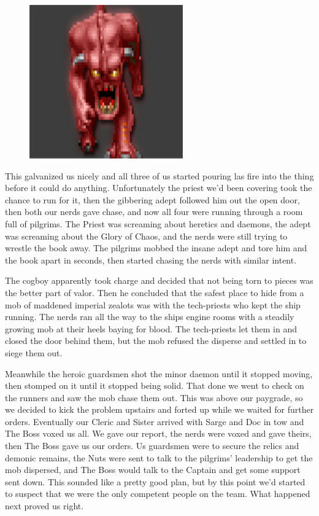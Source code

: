 \begin{figure}
	\begin{center}
		\includegraphics[width=\figwidth]{pics/2/8.png}
	\end{center}
\end{figure}
This galvanized us nicely and all three of us started pouring las fire into the thing before it could do anything. 
Unfortunately the priest we'd been covering took the chance to run for it, then the gibbering adept followed him out the open door, then both our nerds gave chase, and now all four were running through a room full of pilgrims. 
The Priest was screaming about heretics and daemons, the adept was screaming about the Glory of Chaos, and the nerds were still trying to wrestle the book away.
The pilgrims mobbed the insane adept and tore him and the book apart in seconds, then started chasing the nerds with similar intent.

The cogboy apparently took charge and decided that not being torn to pieces was the better part of valor. 
Then he concluded that the safest place to hide from a mob of maddened imperial zealots was with the tech-priests who kept the ship running. 
The nerds ran all the way to the ships engine rooms with a steadily growing mob at their heels baying for blood. 
The tech-priests let them in and closed the door behind them, but the mob refused the disperse and settled in to siege them out.

Meanwhile the heroic guardsmen shot the minor daemon until it stopped moving, then stomped on it until it stopped being solid. 
That done we went to check on the runners and saw the mob chase them out. 
This was above our paygrade, so we decided to kick the problem upstairs and forted up while we waited for further orders. 
Eventually our Cleric and Sister arrived with Sarge and Doc in tow and The Boss voxed us all.
We gave our report, the nerds were voxed and gave theirs, then The Boss gave us our orders. 
Us guardsmen were to secure the relics and demonic remains, the Nuts were sent to talk to the pilgrims' leadership to get the mob dispersed, and The Boss would talk to the Captain and get some support sent down. 
This sounded like a pretty good plan, but by this point we'd started to suspect that we were the only competent people on the team. 
What happened next proved us right.


